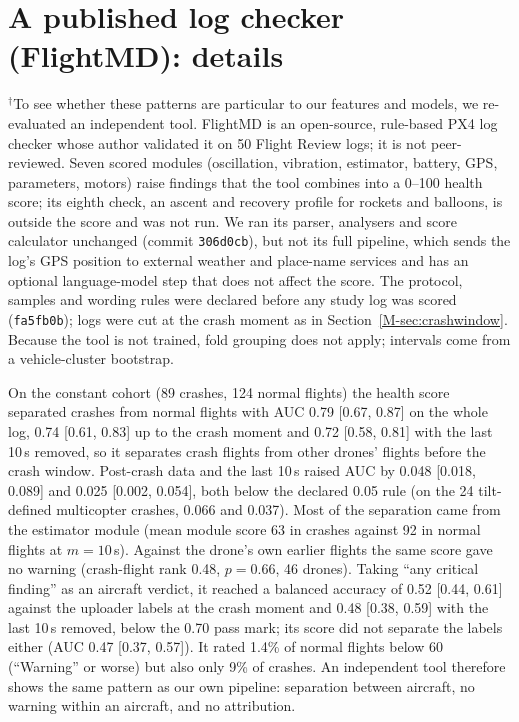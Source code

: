 \documentclass[preprint,12pt]{elsarticle}
\begin{document}
\section{A published log checker (FlightMD): details}
\label{sup:flightmd}
$^\dagger$To see whether these patterns are particular to our features and models, we re-evaluated an independent tool. FlightMD \cite{flightmd2026} is an open-source, rule-based PX4 log checker whose author validated it on 50 Flight Review logs; it is not peer-reviewed. Seven scored modules (oscillation, vibration, estimator, battery, GPS, parameters, motors) raise findings that the tool combines into a 0--100 health score; its eighth check, an ascent and recovery profile for rockets and balloons, is outside the score and was not run. We ran its parser, analysers and score calculator unchanged (commit \texttt{306d0cb}), but not its full pipeline, which sends the log's GPS position to external weather and place-name services and has an optional language-model step that does not affect the score. The protocol, samples and wording rules were declared before any study log was scored (\texttt{fa5fb0b}); logs were cut at the crash moment as in Section~\ref{M-sec:crashwindow}. Because the tool is not trained, fold grouping does not apply; intervals come from a vehicle-cluster bootstrap.

On the constant cohort (89 crashes, 124 normal flights) the health score separated crashes from normal flights with AUC 0.79 [0.67, 0.87] on the whole log, 0.74 [0.61, 0.83] up to the crash moment and 0.72 [0.58, 0.81] with the last 10\,s removed, so it separates crash flights from other drones' flights before the crash window. Post-crash data and the last 10\,s raised AUC by 0.048 [0.018, 0.089] and 0.025 [0.002, 0.054], both below the declared 0.05 rule (on the 24 tilt-defined multicopter crashes, 0.066 and 0.037). Most of the separation came from the estimator module (mean module score 63 in crashes against 92 in normal flights at $m=10$\,s). Against the drone's own earlier flights the same score gave no warning (crash-flight rank 0.48, $p=0.66$, 46 drones). Taking ``any critical finding'' as an aircraft verdict, it reached a balanced accuracy of 0.52 [0.44, 0.61] against the uploader labels at the crash moment and 0.48 [0.38, 0.59] with the last 10\,s removed, below the 0.70 pass mark; its score did not separate the labels either (AUC 0.47 [0.37, 0.57]). It rated 1.4\% of normal flights below 60 (``Warning'' or worse) but also only 9\% of crashes. An independent tool therefore shows the same pattern as our own pipeline: separation between aircraft, no warning within an aircraft, and no attribution.
\FloatBarrier
\end{document}
